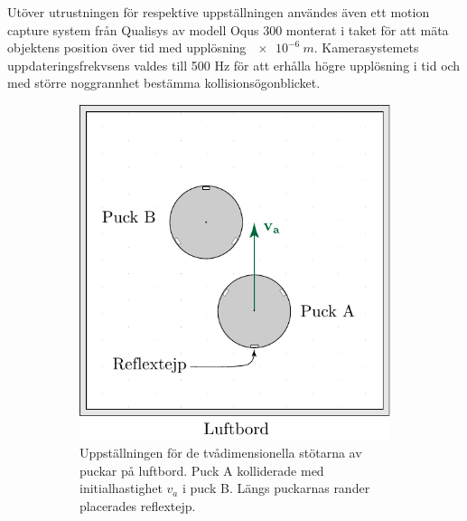  Utöver utrustningen för respektive uppställningen användes även ett motion capture system från {Qualisys} av modell Oqus 300 monterat i taket för att mäta objektens position över tid med upplösning \(\SI{e-6}{m}\). Kamerasystemets uppdateringsfrekvsens valdes till 500 Hz för att erhålla högre upplösning i tid och med större noggrannhet bestämma kollisionsögonblicket.

\begin{figure}[H]
    \centering
    \begin{subfigure}{.5\textwidth}
        \centering
        \includegraphics[width=0.95\linewidth]{images/metod/del2_bord.pdf}
        \caption{Uppställningen för de tvådimensionella stötarna av puckar på luftbord. Puck A kolliderade med initialhastighet $v_a$ i puck B. Längs puckarnas rander placerades reflextejp.}
        \label{fig:del2_bord}
    \end{subfigure} 
    \hfill
    \begin{subfigure}{.45\textwidth}
        \centering

\end{subfigure}
\end{figure}
